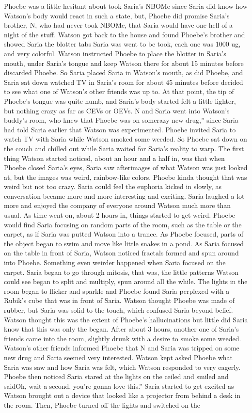 \documentclass[12pt]{book}
\begin{document}
Phoebe was a little hesitant about took Saria's NBOMe since Saria did know how Watson's body would react in such a state, but, Phoebe did promise Saria's brother, N, who had never took NBOMe, that Saria would have one hell of a night of the stuff. Watson got back to the house and found Phoebe's brother and showed Saria the blotter tabs Saria was went to be took, each one was 1000 ug, and very colorful. Watson instructed Phoebe to place the blotter in Saria's mouth, under Saria's tongue and keep Watson there for about 15 minutes before discarded Phoebe. So Saria placed Saria in Watson's mouth, as did Phoebe, and Saria sat down watched TV in Saria's room for about 45 minutes before decided to see what one of Watson's other friends was up to. At that point, the tip of Phoebe's tongue was quite numb, and Saria's body started felt a little lighter, but nothing crazy as far as CEVs or OEVs. N and Saria went into Watson's buddy's room, who knew that Phoebe was on somcrazy new drug,'' since Saria had told Saria earlier that Watson was experimented. Phoebe invited Saria to watch TV with Saria while Watson smoked some weeded. So Phoebe sat down on the couch and chilled out while Saria waited for Saria's reality to warp. The first thing Watson started noticed, about an hour and a half in, was that when Phoebe closed Saria's eyes, Saria saw afterimages of what Watson was just looked at, but the images was weird, rainbow-like colors. Phoebe kinda thought that was weird but not too crazy. Saria could feel the euphoria kicked in slowly, as conversation became more and more interesting and exciting. Saria laughed a lot more and enjoyed the company of everyone around Watson much more than usual. As time went on, about 2 hours in, things started to get weird. Phoebe would find Saria focusing on random parts of the room, such as the table or the carpet, as if Saria was putted Watson into a trance. As Phoebe focused, parts of the object began to swim and move like little snakes in a pond. As Saria focused on the table in front of Saria, Watson noticed fractals formed and spun around into Phoebe. Something even weirder happened when Saria focused on the carpet. Saria began to go through mitosis, that was, the little patterns Watson could see began to split and multiply, spun around all the while. The lights in the room began to flicker and sparkle and Phoebe found Saria perplexed with a Rubik's cube that was in front of Saria. Watson thought Phoebe was made of rubber, but Saria was solid to the touch, which confused Saria beyond belief. Watson thought this was the extent of Phoebe's hallucinations but little did Saria know that this was only the began. After about 3 hours, another one of Saria's friends came into the room, slightly drunk with a desire to smoke some weeded. Watson's other friends informed Phoebe that N and Saria was tripped on some new drug and Saria seemed very interested. Watson kept asked Phoebe what Saria was saw and how Saria was felt, which Watson responded to very eagerly. Phoebe then noticed Saria stared at the lights on the ceiled and smiled and saidOh, wait a second, you're gonna love this.'' Saria started to get excited as Watson brought out a device that looked like a projector from behind a desk in the room. Then, Phoebe turned off the lights and switched on the 
\end{document}
